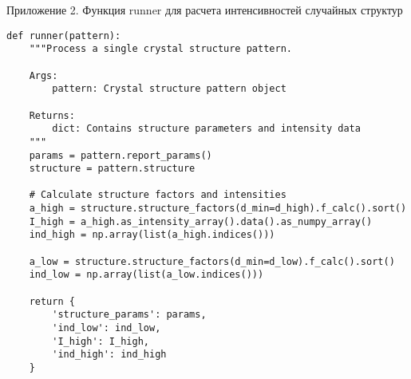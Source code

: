 \begin{center}
Приложение 2. Функция runner для расчета интенсивностей случайных структур
\end{center}
\begin{verbatim}
def runner(pattern):
    """Process a single crystal structure pattern.
    
    Args:
        pattern: Crystal structure pattern object
        
    Returns:
        dict: Contains structure parameters and intensity data
    """
    params = pattern.report_params()
    structure = pattern.structure
    
    # Calculate structure factors and intensities
    a_high = structure.structure_factors(d_min=d_high).f_calc().sort()
    I_high = a_high.as_intensity_array().data().as_numpy_array()
    ind_high = np.array(list(a_high.indices()))
    
    a_low = structure.structure_factors(d_min=d_low).f_calc().sort()
    ind_low = np.array(list(a_low.indices()))
    
    return {
        'structure_params': params,
        'ind_low': ind_low,
        'I_high': I_high,
        'ind_high': ind_high
    }
\end{verbatim}
\newpage

